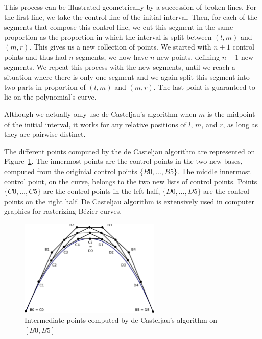 \documentclass{mscs}
\begin{document}
This process can be illustrated geometrically by a succession of broken
lines.
For the first line, we take the control line of the initial
interval.  Then, for each of the segments that compose this control line,
we cut this segment in the same proportion as the proportion in which
the interval is split between \((l,m)\) and \((m,r)\).  This gives us
a new collection of points.  We started with \(n + 1\) control points and
thus had \(n\) segments, we now have \(n\) new points, defining \(n-1\)
new segments.  We repeat this process with the new segments, until we reach
a situation where there is only one segment and we again split this
segment into two parts in proportion of \((l,m)\) and \((m,r)\).  The
last point is guaranteed to lie on the polynomial's curve.

Although we actually only use de Casteljau's algorithm when \(m\) is
the midpoint of the initial interval, it works for any relative
positions of \(l\), \(m\), and \(r\), as long as they are pairwise distinct.

The different points computed by the de Casteljau algorithm are
represented on Figure~\ref{dichobern}. The innermost points are the
control points in the two new bases, computed from the originial control
points $\{B0, \dots, B5\}$.
The middle innermost control point, on the curve, belongs to the two
new lists of control points. Points $\{C0, \dots, C5\}$ are the
control points in the left half, $\{D0, \dots, D5\}$ are the control
points on the right half.
De Casteljau algorithm is extensively used in computer  graphics for
rasterizing B{\'e}zier curves.

\begin{figure}[h]
\begin{center}
\includegraphics[width=0.6\textwidth]{dicho_bern.pdf}
\caption{\label{dichobern}Intermediate points computed by de Casteljau's
 algorithm on $[B0, B5]$}
\end{center}
\end{figure}
\end{document}
